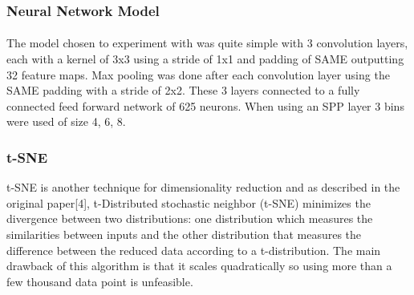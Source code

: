 \documentclass{article}
\begin{document}
\subsubsection{Neural Network Model}
\paragraph{}
The model chosen to experiment with was quite simple with 3 convolution layers, each with a kernel of 3x3 using a stride of 1x1 and padding of SAME outputting 32 feature maps. Max pooling was done after each convolution layer using the SAME padding with a stride of 2x2.  These 3 layers connected to a fully connected feed forward network of 625 neurons. When using an SPP layer 3 bins were used of size 4, 6, 8.

\subsubsection{t-SNE}
t-SNE is another technique for dimensionality reduction and as described in the original paper[4], t-Distributed stochastic neighbor (t-SNE) minimizes the divergence between two distributions: one distribution which measures the similarities between inputs and the other distribution that measures the difference between the reduced data according to a t-distribution. The main drawback of this algorithm is that it scales quadratically so using more than a few thousand data point is unfeasible. 
\end{document}
